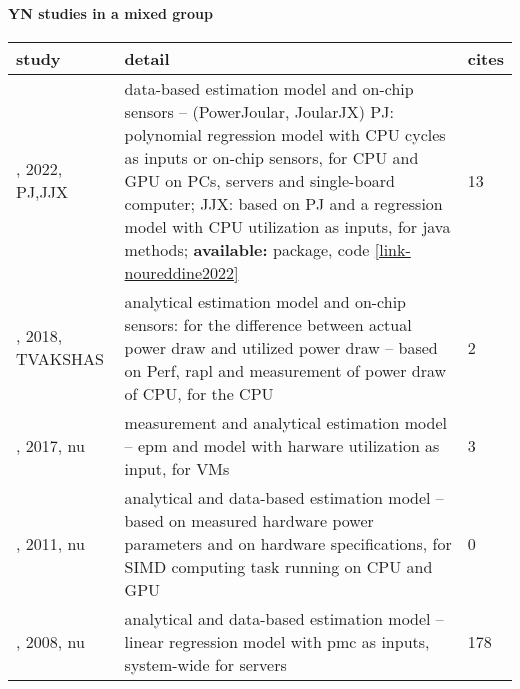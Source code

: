 \paragraph{YN studies in a mixed group} 
 \label{tab:YN-hybrid} 
\begin{longtable}{|>{\raggedright\arraybackslash}p{2.75cm}|p{11.75cm}|p{0.7cm}|}
\toprule
\bfseries study & \bfseries detail & \bfseries cites \\
\midrule 
\endhead
\cite{noureddine2022}, 2022, PJ,JJX & data-based estimation model and on-chip sensors --  (PowerJoular, JoularJX) PJ: polynomial regression model with CPU cycles as inputs or on-chip sensors, for CPU and GPU on PCs, servers and single-board computer; JJX: based on PJ and a regression model with CPU utilization as inputs, for java methods; \textbf{available:} package, code \href{https://github.com/joular}{\ref*{link-noureddine2022}} & 13 \\
\cite{naren2018}, 2018, TVAKSHAS & analytical estimation model and on-chip sensors: for the difference between actual power draw and utilized power draw -- based on Perf, \acrshort{rapl} and measurement of power draw of CPU, for the CPU & 2 \\
\cite{alzamil2017}, 2017, \acrshort{nu} & measurement and analytical estimation model -- \acrshort{epm} and model with harware utilization as input, for VMs & 3 \\
\cite{suda2011}, 2011, \acrshort{nu} & analytical and data-based estimation model -- based on measured hardware power parameters and on hardware specifications, for SIMD computing task running on CPU and GPU & 0 \\
\cite{lewis2008}, 2008, \acrshort{nu} & analytical and data-based estimation model -- linear regression model with \acrshort{pmc} as inputs, system-wide for servers & 178 \\
\bottomrule
\end{longtable}
